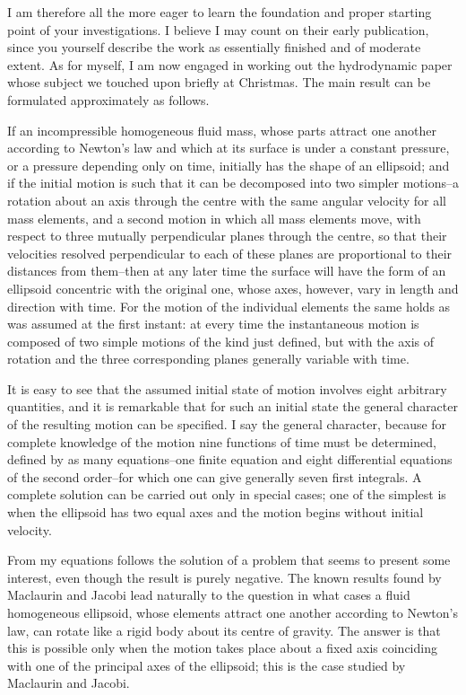 \documentclass[11pt]{article}
\begin{document}
I am therefore all the more eager to learn the foundation and proper starting point of your investigations. I believe I may count on their early publication, since you yourself describe the work as essentially finished and of moderate extent. As for myself, I am now engaged in working out the hydrodynamic paper whose subject we touched upon briefly at Christmas. The main result can be formulated approximately as follows.

If an incompressible homogeneous fluid mass, whose parts attract one another according to Newton's law and which at its surface is under a constant pressure, or a pressure depending only on time, initially has the shape of an ellipsoid; and if the initial motion is such that it can be decomposed into two simpler motions--a rotation about an axis through the centre with the same angular velocity for all mass elements, and a second motion in which all mass elements move, with respect to three mutually perpendicular planes through the centre, so that their velocities resolved perpendicular to each of these planes are proportional to their distances from them--then at any later time the surface will have the form of an ellipsoid concentric with the original one, whose axes, however, vary in length and direction with time. For the motion of the individual elements the same holds as was assumed at the first instant: at every time the instantaneous motion is composed of two simple motions of the kind just defined, but with the axis of rotation and the three corresponding planes generally variable with time.

It is easy to see that the assumed initial state of motion involves eight arbitrary quantities, and it is remarkable that for such an initial state the general character of the resulting motion can be specified. I say the general character, because for complete knowledge of the motion nine functions of time must be determined, defined by as many equations--one finite equation and eight differential equations of the second order--for which one can give generally seven first integrals. A complete solution can be carried out only in special cases; one of the simplest is when the ellipsoid has two equal axes and the motion begins without initial velocity.

From my equations follows the solution of a problem that seems to present some interest, even though the result is purely negative. The known results found by Maclaurin and Jacobi lead naturally to the question in what cases a fluid homogeneous ellipsoid, whose elements attract one another according to Newton's law, can rotate like a rigid body about its centre of gravity. The answer is that this is possible only when the motion takes place about a fixed axis coinciding with one of the principal axes of the ellipsoid; this is the case studied by Maclaurin and Jacobi.
\end{document}
